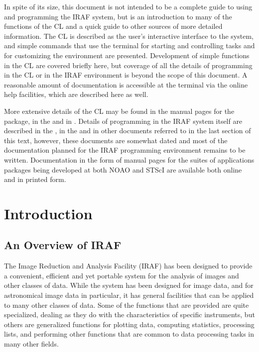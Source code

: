 In spite of its size, this document
is not intended to be a complete guide to using and programming 
the IRAF system, but is an introduction to many of the functions
of the CL and a quick guide to other sources of more detailed information.
The CL is described as the user's interactive interface to the system,
and simple commands that use the terminal for starting and controlling tasks
and for customizing the environment are presented.
Development of simple functions in the CL are covered briefly here, but
coverage of all the details of programming in the CL or in the
IRAF environment is beyond the scope of this document.
A reasonable amount of documentation is accessible at the terminal via
the online help facilities, which are described here as well.

More extensive details of the CL may be found in the manual pages for the
 package, in the  and
in .
Details of programming in the IRAF system itself are described 
in the , 
in the 
and in other documents referred to in the last section of this text,
however, these documents are somewhat dated and most of the documentation
planned for the IRAF programming environment remains to be written.
Documentation in the form of manual pages for the suites of applications
packages being developed at both NOAO and STScI are available both online
and in printed form.

\section{Introduction}

\subsection{An Overview of IRAF}

\ppind
The Image Reduction and Analysis Facility (IRAF) has been designed to
provide a convenient, efficient and yet portable system
for the analysis of images and other classes of data.  While the
system has been designed for image data, and for astronomical image data
in particular, it has general facilities that can be applied to many
other classes of data.  Some of the functions that are
provided are quite specialized, dealing as they do with the 
characteristics of specific instruments, but others are generalized
functions for plotting data, computing statistics, processing lists, and
performing other functions that are common to
data processing tasks in many other fields.

